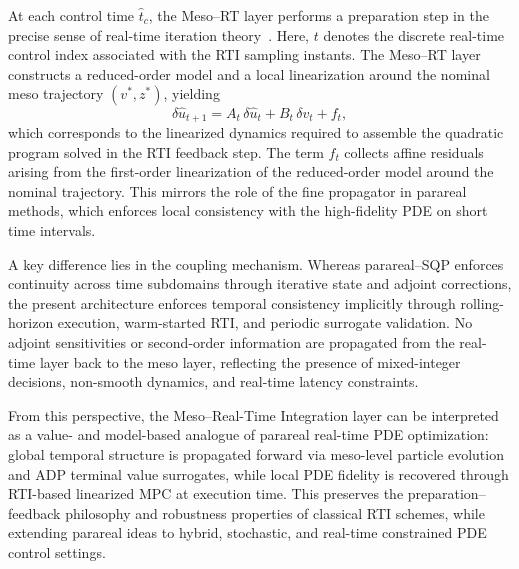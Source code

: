 \documentclass{article}
\newcommand{\1}{\mathds{1}}          %
\theoremstyle{definition}
\begin{document}
\begin{sloppypar}
At each control time $\hat t_c$, the Meso--RT layer performs a preparation step in
the precise sense of real-time iteration theory~\cite{Bock2007}.
Here, $t$ denotes the discrete real-time control index associated with the RTI
sampling instants.
The Meso--RT layer constructs a reduced-order model and a local linearization
around the nominal meso trajectory $(v^{*},z^{*})$, yielding
\[
  \delta \hat{u}_{t+1}
  =
  A_t\,\delta \hat{u}_t
  +
  B_t\,\delta v_t
  +
  f_t,
\]
which corresponds to the linearized dynamics required to assemble the quadratic
program solved in the RTI feedback step. The term $f_t$ collects affine residuals arising from the first-order linearization of the reduced-order model around the nominal trajectory. This mirrors the role of the fine propagator in parareal methods, which enforces local consistency with the high-fidelity PDE on short time intervals.

A key difference lies in the coupling mechanism. Whereas parareal--SQP enforces continuity across time subdomains through iterative state and adjoint corrections, the present architecture enforces temporal consistency implicitly through rolling-horizon execution, warm-started RTI, and periodic surrogate validation.
No adjoint sensitivities or second-order information are propagated from the
real-time layer back to the meso layer, reflecting the presence of mixed-integer
decisions, non-smooth dynamics, and real-time latency constraints.

From this perspective, the Meso--Real-Time Integration layer can be interpreted as
a value- and model-based analogue of parareal real-time PDE optimization:
global temporal structure is propagated forward via meso-level particle evolution
and ADP terminal value surrogates, while local PDE fidelity is recovered through
RTI-based linearized MPC at execution time.
This preserves the preparation--feedback philosophy and robustness properties of
classical RTI schemes, while extending parareal ideas to hybrid, stochastic, and
real-time constrained PDE control settings.


\end{sloppypar}
\end{document}
